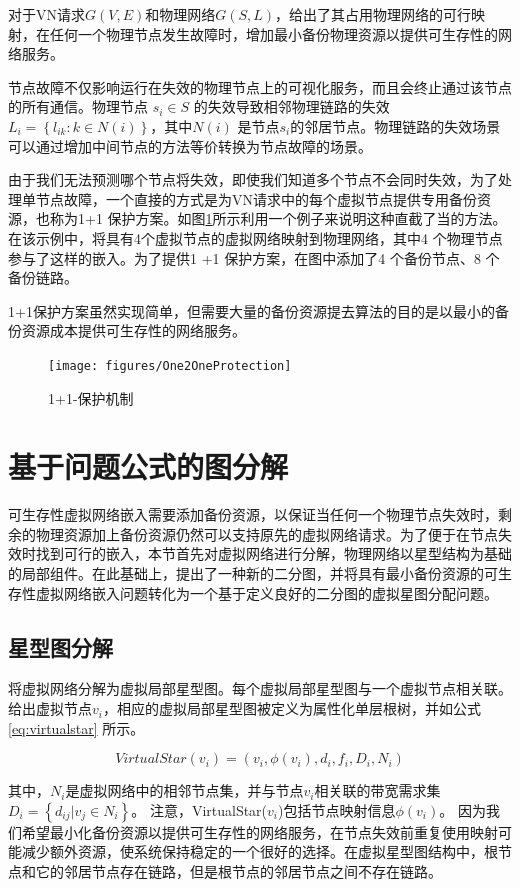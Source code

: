 对于VN请求$G (V,E)$和物理网络$G (S,L)$，给出了其占用物理网络的可行映射，在任何一个物理节点发生故障时，增加最小备份物理资源以提供可生存性的网络服务。

节点故障不仅影响运行在失效的物理节点上的可视化服务，而且会终止通过该节点的所有通信。物理节点 $ {s_i} \in S $ 的失效导致相邻物理链路的失效${L_i} = \left\{ {{l_{ik}}:k \in N(i)} \right\}$，其中${N(i)}$ 是节点$ {s_i} $的邻居节点。物理链路的失效场景可以通过增加中间节点的方法等价转换为节点故障的场景。

由于我们无法预测哪个节点将失效，即使我们知道多个节点不会同时失效，为了处理单节点故障，一个直接的方式是为VN请求中的每个虚拟节点提供专用备份资源，也称为1+1 保护方案。如图\ref{fig:One2OneProtection}所示利用一个例子来说明这种直截了当的方法。在该示例中，将具有4个虚拟节点的虚拟网络映射到物理网络，其中4 个物理节点参与了这样的嵌入。为了提供1 +1 保护方案，在图中添加了4 个备份节点、8 个备份链路。

1+1保护方案虽然实现简单，但需要大量的备份资源提去算法的目的是以最小的备份资源成本提供可生存性的网络服务。

\begin{figure}[htb]
\centering
\texttt{[image: figures/One2OneProtection]}\\
\caption{1+1-保护机制}\label{fig:One2OneProtection}
\end{figure}
\section{基于问题公式的图分解}
可生存性虚拟网络嵌入需要添加备份资源，以保证当任何一个物理节点失效时，剩余的物理资源加上备份资源仍然可以支持原先的虚拟网络请求。为了便于在节点失效时找到可行的嵌入，本节首先对虚拟网络进行分解，物理网络以星型结构为基础的局部组件。在此基础上，提出了一种新的二分图，并将具有最小备份资源的可生存性虚拟网络嵌入问题转化为一个基于定义良好的二分图的虚拟星图分配问题。
\subsection{星型图分解}
将虚拟网络分解为虚拟局部星型图。每个虚拟局部星型图与一个虚拟节点相关联。给出虚拟节点$v_i$，相应的虚拟局部星型图被定义为属性化单层根树，并如公式\ref{eq:virtualstar} 所示。

\begin{equation}
VirtualStar(v_i)=(v_i, \phi(v_i), d_i, f_i, D_i, N_i)
\label{eq:virtualstar}
\end{equation}


其中，$N_i$是虚拟网络中的相邻节点集，并与节点$v_i$相关联的带宽需求集${D_i} = \left\{ {{d_{ij}}|{v_j} \in {N_i}} \right\} $。 注意，VirtualStar($v_i$)包括节点映射信息$\phi(v_i)$。 因为我们希望最小化备份资源以提供可生存性的网络服务，在节点失效前重复使用映射可能减少额外资源，使系统保持稳定的一个很好的选择。在虚拟星型图结构中，根节点和它的邻居节点存在链路，但是根节点的邻居节点之间不存在链路。


